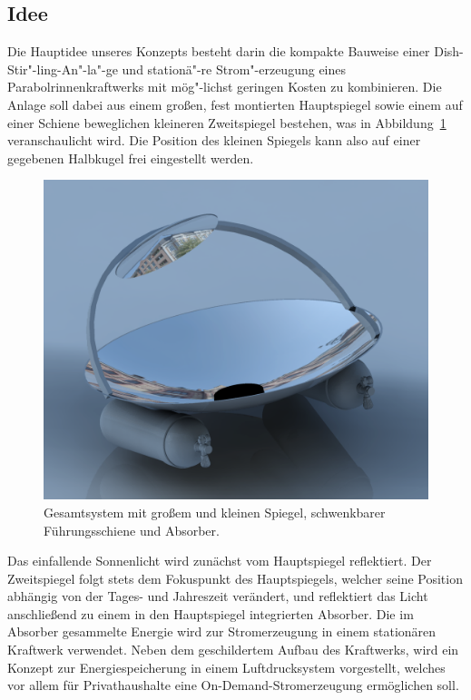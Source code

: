 \documentclass[fontsize=10pt,paper=a4,bibliography=totoc]{scrartcl}
\begin{document}
\subsection{Idee}
Die Hauptidee unseres Konzepts besteht darin die kompakte Bauweise einer Dish-Stir"-ling-An"-la"-ge und stationä"-re Strom"-erzeugung eines Parabolrinnenkraftwerks mit mög"-lichst geringen Kosten zu kombinieren. Die Anlage soll dabei aus einem großen, fest montierten Hauptspiegel sowie einem auf einer Schiene beweglichen kleineren Zweitspiegel bestehen, was in Abbildung~\ref{pic:system_rendered} veranschaulicht wird. Die Position des kleinen Spiegels kann also auf einer gegebenen Halbkugel frei eingestellt werden.
\begin{figure}[htb]
	\centering
	\includegraphics[width=\textwidth]{images/SMALL_MIRROR}
	\caption[Gesamtsystem]{Gesamtsystem mit großem und kleinen Spiegel, schwenkbarer Führungsschiene und Absorber.}
	\label{pic:system_rendered}
\end{figure}
Das einfallende Sonnenlicht wird zunächst vom Hauptspiegel reflektiert. Der Zweitspiegel folgt stets dem Fokuspunkt des Hauptspiegels, welcher seine Position abhängig von der Tages- und Jahreszeit verändert, und reflektiert das Licht anschließend zu einem in den Hauptspiegel integrierten Absorber.  Die im Absorber gesammelte Energie wird zur Stromerzeugung in einem stationären Kraftwerk verwendet.
Neben dem geschildertem Aufbau des Kraftwerks, wird ein Konzept zur Energiespeicherung in einem Luftdrucksystem vorgestellt, welches vor allem für Privathaushalte eine On-Demand-Stromerzeugung ermöglichen soll.
\end{document}
